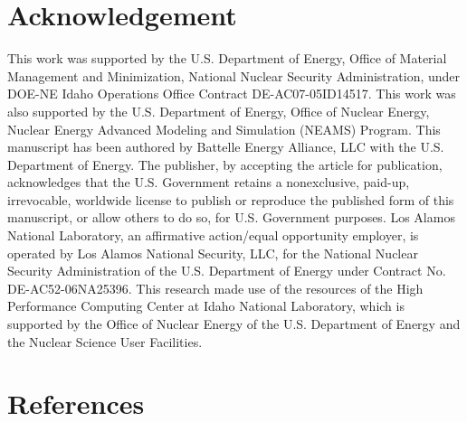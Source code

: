 \documentclass[review]{elsarticle}
\begin{document}
\section{Acknowledgement}
This work was supported by the U.S. Department of Energy, Office of Material Management and Minimization, National Nuclear Security Administration, under DOE-NE Idaho Operations Office Contract DE-AC07-05ID14517. This work was also supported by the U.S. Department of Energy, Office of Nuclear Energy, Nuclear Energy Advanced Modeling and Simulation (NEAMS) Program. This manuscript has been authored by Battelle Energy Alliance, LLC with the U.S. Department of Energy. The publisher, by accepting the article for publication, acknowledges that the U.S. Government retains a nonexclusive, paid-up, irrevocable, worldwide license to publish or reproduce the published form of this manuscript, or allow others to do so, for U.S. Government purposes. Los Alamos National Laboratory, an affirmative action/equal opportunity employer, is operated by Los Alamos National Security, LLC, for the National Nuclear Security Administration of the U.S. Department of Energy under Contract No. DE-AC52-06NA25396. This research made use of the resources of the High Performance Computing Center at Idaho National Laboratory, which is supported by the Office of Nuclear Energy of the U.S. Department of Energy and the Nuclear Science User Facilities.

\section{References}


\end{document}
